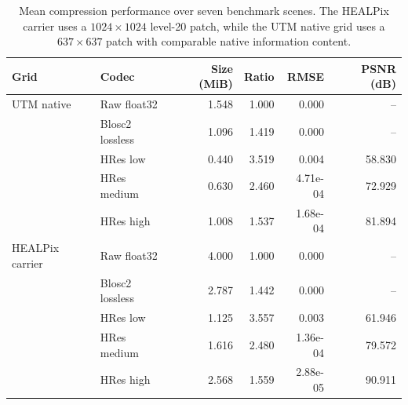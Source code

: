 \begin{table}[t]
\centering
\caption{Mean compression performance over seven benchmark scenes. The HEALPix carrier uses a $1024\times1024$ level-20 patch, while the UTM native grid uses a $637\times637$ patch with comparable native information content.}
\label{tab:grid_codec_summary}
\begin{tabular}{@{}llrrrr@{}}
\toprule
Grid & Codec & Size (MiB) & Ratio & RMSE & PSNR (dB) \\
\midrule
UTM native & Raw float32 & 1.548 & 1.000 & 0.000 & -- \\
 & Blosc2 lossless & 1.096 & 1.419 & 0.000 & -- \\
 & HRes low & 0.440 & 3.519 & 0.004 & 58.830 \\
 & HRes medium & 0.630 & 2.460 & 4.71e-04 & 72.929 \\
 & HRes high & 1.008 & 1.537 & 1.68e-04 & 81.894 \\
\midrule
HEALPix carrier & Raw float32 & 4.000 & 1.000 & 0.000 & -- \\
 & Blosc2 lossless & 2.787 & 1.442 & 0.000 & -- \\
 & HRes low & 1.125 & 3.557 & 0.003 & 61.946 \\
 & HRes medium & 1.616 & 2.480 & 1.36e-04 & 79.572 \\
 & HRes high & 2.568 & 1.559 & 2.88e-05 & 90.911 \\
\bottomrule
\end{tabular}
\end{table}
